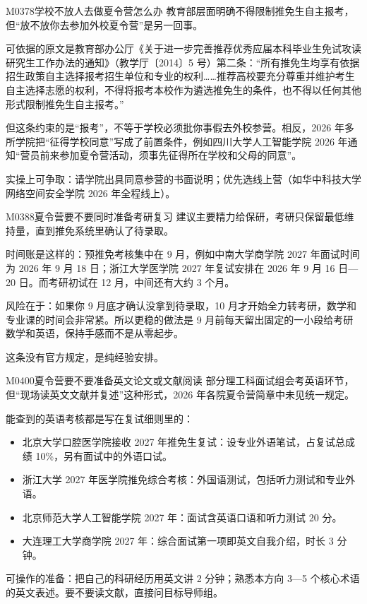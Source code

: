 \begin{qa}{M0378}{学校不放人去做夏令营怎么办}
教育部层面明确不得限制推免生自主报考，但“放不放你去参加外校夏令营”是另一回事。

可依据的原文是教育部办公厅《关于进一步完善推荐优秀应届本科毕业生免试攻读研究生工作办法的通知》（教学厅〔2014〕5 号）第二条：“所有推免生均享有依据招生政策自主选择报考招生单位和专业的权利……推荐高校要充分尊重并维护考生自主选择志愿的权利，不得将报考本校作为遴选推免生的条件，也不得以任何其他形式限制推免生自主报考。”

但这条约束的是“报考”，不等于学校必须批你事假去外校参营。相反，2026 年多所学院把“征得学校同意”写成了前置条件，例如四川大学人工智能学院 2026 年通知“营员前来参加夏令营活动，须事先征得所在学校和父母的同意”。

实操上可争取：请学院出具同意参营的书面说明；优先选线上营（如华中科技大学网络空间安全学院 2026 年全程线上）。
\end{qa}

\begin{qa}{M0388}{夏令营要不要同时准备考研复习}
建议主要精力给保研，考研只保留最低维持量，直到推免系统里确认了待录取。

时间账是这样的：预推免考核集中在 9 月，例如中南大学商学院 2027 年面试时间为 2026 年 9 月 18 日；浙江大学医学院 2027 年复试安排在 2026 年 9 月 16 日—20 日。而考研初试在 12 月，中间还有大约 3 个月。

风险在于：如果你 9 月底才确认没拿到待录取，10 月才开始全力转考研，数学和专业课的时间会非常紧。所以更稳的做法是 9 月前每天留出固定的一小段给考研数学和英语，保持手感而不是从零起步。

这条没有官方规定，是纯经验安排。
\end{qa}

\begin{qa}{M0400}{夏令营要不要准备英文论文或文献阅读}
部分理工科面试组会考英语环节，但“现场读英文文献并复述”这种形式，2026 年各院夏令营简章中未见统一规定。

能查到的英语考核都是写在复试细则里的：
\begin{itemize}
  \item 北京大学口腔医学院接收 2027 年推免生复试：设专业外语笔试，占复试总成绩 10\%，另有面试中的外语口试。
  \item 浙江大学 2027 年医学院推免综合考核：外国语测试，包括听力测试和专业外语。
  \item 北京师范大学人工智能学院 2027 年：面试含英语口语和听力测试 20 分。
  \item 大连理工大学商学院 2027 年：综合面试第一项即英文自我介绍，时长 3 分钟。
\end{itemize}

可操作的准备：把自己的科研经历用英文讲 2 分钟；熟悉本方向 3—5 个核心术语的英文表述。要不要读文献，直接问目标导师组。
\end{qa}

